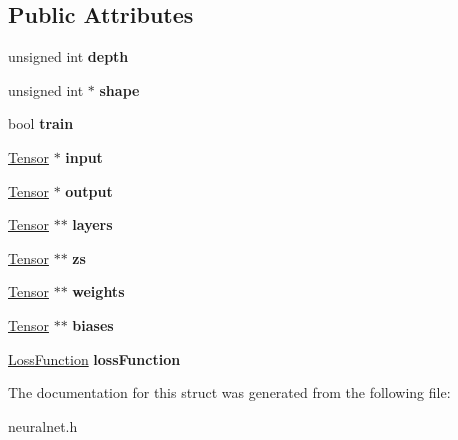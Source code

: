 \subsection*{Public Attributes}
\begin{DoxyCompactItemize}
\item 
unsigned int {\bfseries depth}\hypertarget{structNeuralNet_ae3b433e9ccb78a471e8ccde61e82eed4}{}\label{structNeuralNet_ae3b433e9ccb78a471e8ccde61e82eed4}

\item 
unsigned int $\ast$ {\bfseries shape}\hypertarget{structNeuralNet_a1b4f8d7fccd76ed311b6daf17ac9b422}{}\label{structNeuralNet_a1b4f8d7fccd76ed311b6daf17ac9b422}

\item 
bool {\bfseries train}\hypertarget{structNeuralNet_a98890c143f4cfe67fa53725e8fc8363d}{}\label{structNeuralNet_a98890c143f4cfe67fa53725e8fc8363d}

\item 
\hyperlink{structTensor}{Tensor} $\ast$ {\bfseries input}\hypertarget{structNeuralNet_a254652197189ea13a3dbc39c018a1cfe}{}\label{structNeuralNet_a254652197189ea13a3dbc39c018a1cfe}

\item 
\hyperlink{structTensor}{Tensor} $\ast$ {\bfseries output}\hypertarget{structNeuralNet_a4e4276eed10edea3c2131d7d8adf6ea7}{}\label{structNeuralNet_a4e4276eed10edea3c2131d7d8adf6ea7}

\item 
\hyperlink{structTensor}{Tensor} $\ast$$\ast$ {\bfseries layers}\hypertarget{structNeuralNet_a4e067fc722269cfa5cba99d774ae95da}{}\label{structNeuralNet_a4e067fc722269cfa5cba99d774ae95da}

\item 
\hyperlink{structTensor}{Tensor} $\ast$$\ast$ {\bfseries zs}\hypertarget{structNeuralNet_ae7ab1a9f274d7b4c676636a5ed139921}{}\label{structNeuralNet_ae7ab1a9f274d7b4c676636a5ed139921}

\item 
\hyperlink{structTensor}{Tensor} $\ast$$\ast$ {\bfseries weights}\hypertarget{structNeuralNet_a5c6cdca210ffccbfd5a528695fcba0ad}{}\label{structNeuralNet_a5c6cdca210ffccbfd5a528695fcba0ad}

\item 
\hyperlink{structTensor}{Tensor} $\ast$$\ast$ {\bfseries biases}\hypertarget{structNeuralNet_ad90da192ec3c448ceca6604431549f54}{}\label{structNeuralNet_ad90da192ec3c448ceca6604431549f54}

\item 
\hyperlink{structLossFunction}{Loss\+Function} {\bfseries loss\+Function}\hypertarget{structNeuralNet_a5a404b1313ef274243bd8ba81490b79e}{}\label{structNeuralNet_a5a404b1313ef274243bd8ba81490b79e}

\end{DoxyCompactItemize}


The documentation for this struct was generated from the following file\+:\begin{DoxyCompactItemize}
\item 
neuralnet.\+h\end{DoxyCompactItemize}
